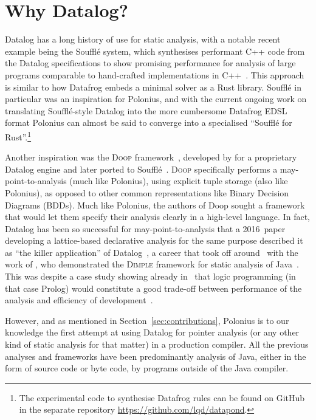 \documentclass[11pt,a4paper,twoside,openany]{report}
\begin{document}
\section{Why Datalog?}\label{sec:why-datalog}

Datalog has a long history of use for static analysis, with a notable recent
example being the Souffl{\'e} system, which synthesises performant C++ code from
the Datalog specifications to show promising performance for analysis of large
programs comparable to hand-crafted implementations in
C++~\cite{scholz_fast_2016}. This approach is similar to how Datafrog embeds a
minimal solver as a Rust library. Souffl{\'e} in particular was an inspiration
for Polonius, and with the current ongoing work on translating Souffl{\'e}-style
Datalog into the more cumbersome Datafrog EDSL format Polonius can almost be
said to converge into a specialised ``Souffl{\'e} for Rust''.\footnote{The
  experimental code to synthesise Datafrog rules can be found on GitHub in the
  separate repository \url{https://github.com/lqd/datapond}.}

Another inspiration was the \textsc{Doop}
framework~\cite{smaragdakis_using_2010}, developed by
\citeauthor*{smaragdakis_using_2010} for a proprietary Datalog engine and later
ported to Souffl{\'e}~\cite{doop-porting}. \textsc{Doop} specifically performs a
may-point-to-analysis (much like Polonius), using explicit tuple storage (also
like Polonius), as opposed to other common representations like Binary Decision
Diagrams (BDDs). Much like Polonius, the authors of Doop sought a framework that
would let them specify their analysis clearly in a high-level language. In fact,
Datalog has been so successful for may-point-to-analysis that a 2016~paper
developing a lattice-based declarative analysis for the same purpose described
it as ``the killer application'' of
Datalog~\cite{Madsen:2016:DFD:2980983.2908096}, a career that took off
around~\citeyear{Benton:2007:ISD:1273920.1273923} with the work of
\citeauthor{Benton:2007:ISD:1273920.1273923}, who demonstrated the
\textsc{Dimple} framework for static analysis of
Java~\cite{Benton:2007:ISD:1273920.1273923}. This was despite a case study
showing already in~\citeyear{Dawson:1996:PPA:231379.231399} that logic
programming (in that case Prolog) would constitute a good trade-off between
performance of the analysis and efficiency of
development~\cite{Dawson:1996:PPA:231379.231399}.

However, and as mentioned in Section~\ref{sec:contributions}, Polonius is to our
knowledge the first attempt at using Datalog for pointer analysis (or any other
kind of static analysis for that matter) in a production compiler. All the
previous analyses and frameworks have been predominantly analysis of Java,
either in the form of source code or byte code, by programs outside of the Java
compiler.
\end{document}

